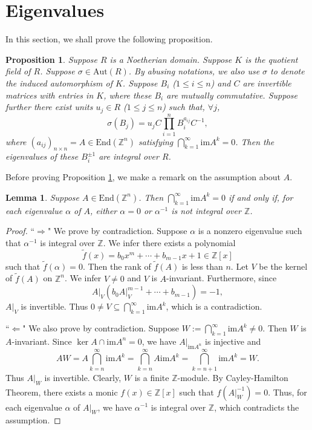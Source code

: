 \documentclass[12pt]{amsart}
\theoremstyle{plain}
\newtheorem{proposition}[theorem]{Proposition}
\newtheorem{lemma}[theorem]{Lemma}
\theoremstyle{definition}
\theoremstyle{question}
\theoremstyle{remark}
\theoremstyle{assumption}
\numberwithin{equation}{section}
\theoremstyle{bigthm}
\begin{document}
\section{Eigenvalues}\label{sec_eigenvalue}
In this section, we shall prove the following proposition.

\begin{proposition}\label{prop_eigenvalue}
Suppose $R$ is a Noetherian domain. Suppose $K$ is the quotient field of $R$. Suppose $\sigma \in \mathrm{Aut} (R)$. By abusing notations, we also use $\sigma$ to denote the induced automorphism of $K$. Suppose $B_{i}$ ($1 \leq i \leq n$) and $C$ are invertible matrices with entries in $K$, where these $B_{i}$ are mutually commutative. Suppose further there exist units $u_{j} \in R$ ($1 \leq j \leq n$) such that, $\forall j$,
\begin{equation}\label{prop_eigenvalue_1}
\sigma \left( B_{j} \right) = u_{j} C \prod_{i=1}^{n} B_{i}^{a_{ij}} C^{-1},
\end{equation}
where $(a_{ij})_{n \times n} = A \in \mathrm{End} (\mathbb{Z}^{n})$ satisfying $\bigcap_{k=1}^{\infty} \mathrm{im} A^{k} =0$. Then the eigenvalues of these $B_{i}^{\pm 1}$ are integral over $R$.
\end{proposition}

Before proving Proposition \ref{prop_eigenvalue}, we make a remark on the assumption about $A$.
\begin{lemma}\label{lem_matrix_eigenvalue}
Suppose $A \in \mathrm{End} (\mathbb{Z}^{n})$. Then $\bigcap_{k=1}^{\infty} \mathrm{im} A^{k} =0$ if and only if, for each eigenvalue $\alpha$ of $A$, either $\alpha =0$ or $\alpha^{-1}$ is not integral over $\mathbb{Z}$.
\end{lemma}
\begin{proof}
``$\Rightarrow$" We prove by contradiction. Suppose $\alpha$ is a nonzero eigenvalue such that $\alpha^{-1}$ is integral over $\mathbb{Z}$. We infer there exists a polynomial
\[
\tilde{f} (x) = b_{0} x^{m} + \cdots + b_{m-1} x + 1 \in \mathbb{Z}[x]
\]
such that $\tilde{f} (\alpha) =0$. Then the rank of $\tilde{f} (A)$ is less than $n$. Let $V$ be the kernel of $\tilde{f} (A)$ on $\mathbb{Z}^{n}$. We infer $V \neq 0$ and $V$ is $A$-invariant. Furthermore, since
\[
A|_{V} (b_{0} A|_{V}^{m-1} + \cdots + b_{m-1}) = -1,
\]
$A|_{V}$ is invertible. Thus $0 \neq V \subseteq \bigcap_{k=1}^{\infty} \mathrm{im} A^{k}$, which is a contradiction.

``$\Leftarrow$" We also prove by contradiction. Suppose $W := \bigcap_{k=1}^{\infty} \mathrm{im} A^{k} \neq 0$. Then $W$ is $A$-invariant. Since $\ker A \cap \mathrm{im} A^{n} = 0$, we have $A|_{\mathrm{im} A^{n}}$ is injective and
\[
AW = A \bigcap_{k=n}^{\infty} \mathrm{im} A^{k} = \bigcap_{k=n}^{\infty} A \mathrm{im} A^{k} = \bigcap_{k=n+1}^{\infty} \mathrm{im} A^{k} = W.
\]
Thus $A|_{W}$ is invertible. Clearly, $W$ is a finite $\mathbb{Z}$-module. By Cayley-Hamilton Theorem, there exists a monic $f(x) \in \mathbb{Z}[x]$ such that $f(A|_{W}^{-1}) =0$. Thus, for each eigenvalue $\alpha$ of $A|_{W}$, we have $\alpha^{-1}$ is integral over $\mathbb{Z}$, which contradicts the assumption.
\end{proof}
\end{document}

